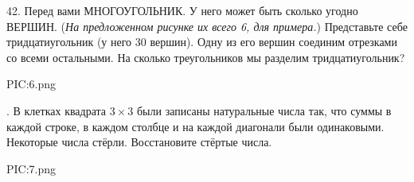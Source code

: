 42. Перед вами МНОГОУГОЛЬНИК. У него может быть сколько угодно ВЕРШИН. ({\it На предложенном рисунке их всего 6, для примера.}) Представьте себе тридцатиугольник (у него 30 вершин). Одну из его вершин соединим отрезками со всеми остальными. На сколько треугольников мы разделим тридцатиугольник?
\begin{center}
{{PIC:6.png}}
\end{center}
\newpage
{}. В клетках квадрата $3\times3$ были записаны натуральные числа так, что суммы в каждой строке, в каждом столбце и на каждой диагонали были одинаковыми. Некоторые числа стёрли. Восстановите стёртые числа.
\begin{center}
{{PIC:7.png}}
\end{center}
